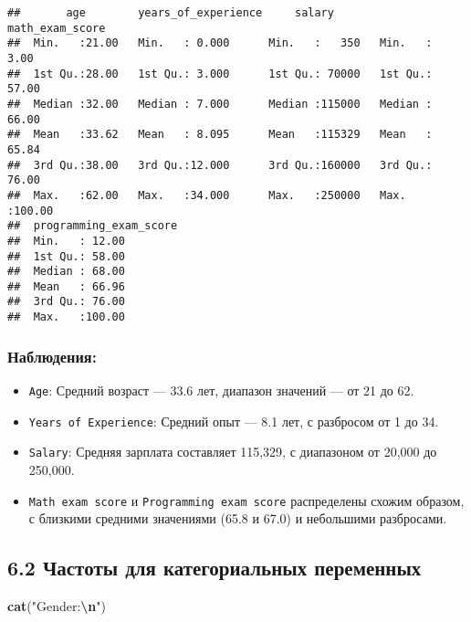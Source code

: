 \documentclass[
]{article}
\newenvironment{Shaded}{\begin{snugshade}}{\end{snugshade}}
\newcommand{\FunctionTok}[1]{\textcolor[rgb]{0.13,0.29,0.53}{\textbf{#1}}}
\newcommand{\NormalTok}[1]{#1}
\newcommand{\SpecialCharTok}[1]{\textcolor[rgb]{0.81,0.36,0.00}{\textbf{#1}}}
\newcommand{\StringTok}[1]{\textcolor[rgb]{0.31,0.60,0.02}{#1}}
\providecommand{\tightlist}{%
  \setlength{\itemsep}{0pt}\setlength{\parskip}{0pt}}
\begin{document}
\begin{verbatim}
##       age        years_of_experience     salary       math_exam_score 
##  Min.   :21.00   Min.   : 0.000      Min.   :   350   Min.   :  3.00  
##  1st Qu.:28.00   1st Qu.: 3.000      1st Qu.: 70000   1st Qu.: 57.00  
##  Median :32.00   Median : 7.000      Median :115000   Median : 66.00  
##  Mean   :33.62   Mean   : 8.095      Mean   :115329   Mean   : 65.84  
##  3rd Qu.:38.00   3rd Qu.:12.000      3rd Qu.:160000   3rd Qu.: 76.00  
##  Max.   :62.00   Max.   :34.000      Max.   :250000   Max.   :100.00  
##  programming_exam_score
##  Min.   : 12.00        
##  1st Qu.: 58.00        
##  Median : 68.00        
##  Mean   : 66.96        
##  3rd Qu.: 76.00        
##  Max.   :100.00
\end{verbatim}

\subsubsection{Наблюдения:}\label{ux43dux430ux431ux43bux44eux434ux435ux43dux438ux44f-2}

\begin{itemize}
\tightlist
\item
  \texttt{Age}: Средний возраст --- 33.6 лет, диапазон значений --- от
  21 до 62.
\item
  \texttt{Years\ of\ Experience}: Средний опыт --- 8.1 лет, с разбросом
  от 1 до 34.
\item
  \texttt{Salary}: Средняя зарплата составляет 115,329, с диапазоном от
  20,000 до 250,000.
\item
  \texttt{Math\ exam\ score} и \texttt{Programming\ exam\ score}
  распределены схожим образом, с близкими средними значениями (65.8 и
  67.0) и небольшими разбросами.
\end{itemize}

\subsection{6.2 Частоты для категориальных
переменных}\label{ux447ux430ux441ux442ux43eux442ux44b-ux434ux43bux44f-ux43aux430ux442ux435ux433ux43eux440ux438ux430ux43bux44cux43dux44bux445-ux43fux435ux440ux435ux43cux435ux43dux43dux44bux445}

\begin{Shaded}
\begin{Highlighting}[]
\FunctionTok{cat}\NormalTok{(}\StringTok{"Gender:}\SpecialCharTok{\textbackslash{}n}\StringTok{"}\NormalTok{)}
\end{Highlighting}
\end{Shaded}
\end{document}
